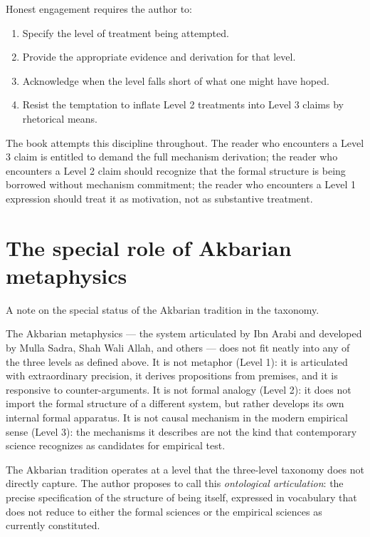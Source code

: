 Honest engagement requires the author to:

\begin{enumerate}[leftmargin=2em]
    \item Specify the level of treatment being attempted.
    \item Provide the appropriate evidence and derivation for that
    level.
    \item Acknowledge when the level falls short of what one might
    have hoped.
    \item Resist the temptation to inflate Level 2 treatments into
    Level 3 claims by rhetorical means.
\end{enumerate}

The book attempts this discipline throughout. The reader who
encounters a Level 3 claim is entitled to demand the full mechanism
derivation; the reader who encounters a Level 2 claim should
recognize that the formal structure is being borrowed without
mechanism commitment; the reader who encounters a Level 1 expression
should treat it as motivation, not as substantive treatment.

\section{The special role of Akbarian metaphysics}
\label{sec:akbarian-role}

A note on the special status of the Akbarian tradition in the
taxonomy.

The Akbarian metaphysics --- the system articulated by Ibn Arabi and
developed by Mulla Sadra, Shah Wali Allah, and others --- does not
fit neatly into any of the three levels as defined above. It is not
metaphor (Level 1): it is articulated with extraordinary precision,
it derives propositions from premises, and it is responsive to
counter-arguments. It is not formal analogy (Level 2): it does not
import the formal structure of a different system, but rather
develops its own internal formal apparatus. It is not causal
mechanism in the modern empirical sense (Level 3): the mechanisms it
describes are not the kind that contemporary science recognizes as
candidates for empirical test.

The Akbarian tradition operates at a level that the three-level
taxonomy does not directly capture. The author proposes to call this
\emph{ontological articulation}: the precise specification of the
structure of being itself, expressed in vocabulary that does not
reduce to either the formal sciences or the empirical sciences as
currently constituted.

